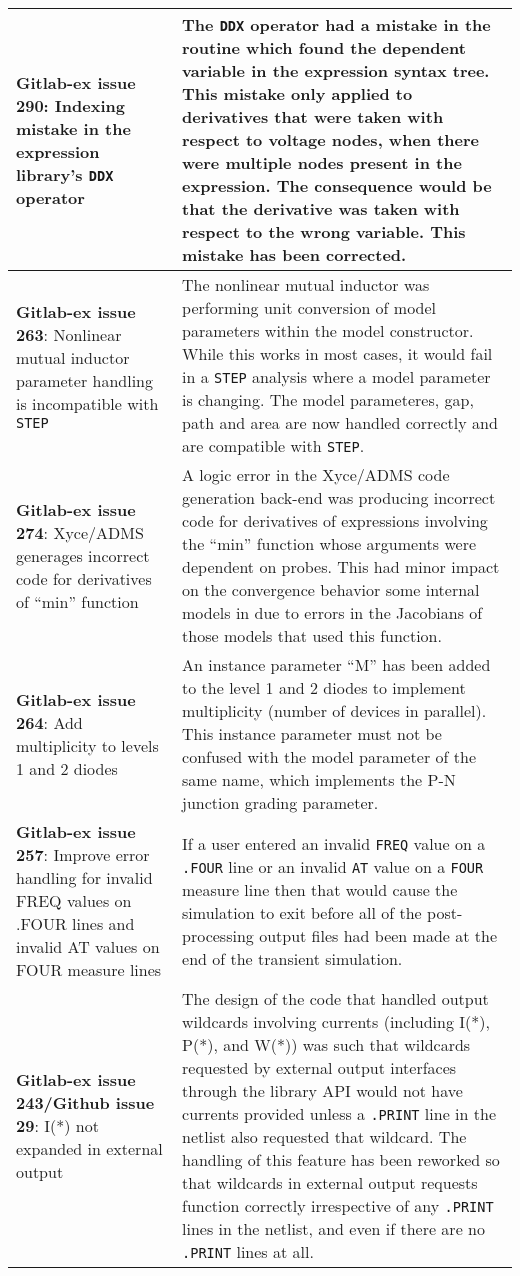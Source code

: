 {\begin{longtable}[h] {>{\raggedright\small}m{2in}|>{\raggedright\let\\\tabularnewline\small}m{3.5in}}
\textbf{Gitlab-ex issue 290}: Indexing mistake in the expression library's \texttt{DDX} operator & 
The \texttt{DDX} operator had a mistake in the routine which found the dependent variable in the 
expression syntax tree.  This mistake only applied to derivatives that were taken with respect to 
voltage nodes, when there were multiple nodes present in the expression.  The consequence would be 
  that the derivative was taken with respect to the wrong variable.  This mistake has been corrected.  \\ \hline

\textbf{Gitlab-ex issue 263}: Nonlinear mutual inductor parameter handling is incompatible with \texttt{STEP} &
The nonlinear mutual inductor was performing unit conversion of model parameters within the model
constructor.  While this works in most cases, it would fail in a \texttt{STEP} analysis where
a model parameter is changing.  The model parameteres, gap, path and area are now handled
correctly and are compatible with \texttt{STEP}. \\ \hline
\textbf{Gitlab-ex issue 274}: Xyce/ADMS generages incorrect code for derivatives of ``min'' function &
A logic error in the Xyce/ADMS code generation back-end was producing
incorrect code for derivatives of expressions involving the ``min''
function whose arguments were dependent on probes.  This had minor
impact on the convergence behavior some internal models in \Xyce{} due
to errors in the Jacobians of those models that used this
function.  \\ \hline
\textbf{Gitlab-ex issue 264}: Add multiplicity to levels 1 and 2 diodes &
 An instance parameter ``M'' has been added to the level 1 and 2
diodes to implement multiplicity (number of devices in parallel).
This instance parameter must not be confused with the model parameter
of the same name, which implements the P-N junction grading
parameter. \\ \hline

\textbf{Gitlab-ex issue 257}: Improve error handling for invalid
FREQ values on .FOUR lines and invalid AT values on FOUR measure
lines & If a \Xyce{} user entered an invalid \texttt{FREQ} value
on a \texttt{.FOUR} line or an invalid \texttt{AT} value on a
\texttt{FOUR} measure line then that would cause the simulation
to exit before all of the post-processing output files had been
made at the end of the transient simulation. \\ \hline

\textbf{Gitlab-ex issue 243/Github issue 29}: I(*) not expanded in external output &
The design of the code that handled output wildcards involving
currents (including I(*), P(*), and W(*)) was such that wildcards
requested by external output interfaces through the library API would
not have currents provided unless a \texttt{.PRINT} line in the
netlist also requested that wildcard.  The handling of this feature
has been reworked so that wildcards in external output requests
function correctly irrespective of any \texttt{.PRINT} lines in the
netlist, and even if there are no \texttt{.PRINT} lines at
all.\\ \hline


\end{longtable}}
